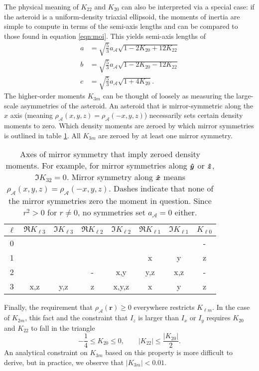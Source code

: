 The physical meaning of $K_{22}$ and $K_{20}$ can also be interpreted via a special case: if the asteroid is a uniform-density triaxial ellipsoid, the moments of inertia are simple to compute in terms of the semi-axis lengths and can be compared to those found in equation \ref{eqn:moi}. This yields semi-axis lengths of 
\begin{equation}
  \begin{split}
  a &= \sqrt{\frac{5}{3}}a_\mathcal{A}\sqrt{1-2K_{20}+12K_{22}}\\
  b &= \sqrt{\frac{5}{3}}a_\mathcal{A}\sqrt{1-2K_{20}-12K_{22}}\\
  c &= \sqrt{\frac{5}{3}}a_\mathcal{A}\sqrt{1+4K_{20}}.
  \label{eqn:ellipsoid-axes}
  \end{split}
\end{equation}
The higher-order moments $K_{3m}$ can be thought of loosely as measuring the large-scale asymmetries of the asteroid. An asteroid that is mirror-symmetric along the $\unit{x}$ axis (meaning $\rho_\mathcal{A}(x,y,z)=\rho_\mathcal{A}(-x,y,z)$) necessarily sets certain density moments to zero. Which density moments are zeroed by which mirror symmetries is outlined in table \ref{tab:klm-symmetries}. All $K_{3m}$ are zeroed by at least one mirror symmetry. 

\begin{table}
  \centering
  \begin{tabular}{c|ccccccc}
    \hline
    $\ell$ & $\Re K_{\ell 3}$ & $\Im K_{\ell 3}$ & $\Re K_{\ell 2}$ & $\Im K_{\ell 2}$ & $\Re K_{\ell 1}$ & $\Im K_{\ell 1}$ & $K_{\ell 0}$ \\ \hline
    0 &  &  &  &  &  &  & -\\ 
    1 &  &  &  &  & x & y & z\\ 
    2 &  &  & - & x,y & y,z & x,z & -\\ 
    3 & x,z & y,z & z & x,y,z & x & y & z\\ \hline
  \end{tabular}
  \caption{Axes of mirror symmetry that imply zeroed density moments. For example, for mirror symmetries along $\bm{\hat{y}}$ or $\bm{\hat{z}}$, $\Im K_{32}=0$. Mirror symmetry along $\bm{\hat{x}}$ means $\rho_\mathcal{A}(x, y, z) = \rho_\mathcal{A}(-x, y, z)$. Dashes indicate that none of the mirror symmetries zero the moment in question. Since $r^2>0$ for $r\neq 0$, no symmetries set $a_\mathcal{A}=0$ either.}
  \label{tab:klm-symmetries}
\end{table} 

Finally, the requirement that $\rho_\mathcal{A}(\bm r) \geq 0$ everywhere restricts $K_{\ell m}$. In the case of $K_{2m}$, this fact and the constraint that $I_z$ is larger than $I_x$ or $I_y$ requires $K_{20}$ and $K_{22}$ to fall in the triangle
\begin{equation}
  -\frac{1}{4} \leq K_{20} \leq 0, \qquad |K_{22}| \leq \frac{|K_{20}|}{2}.
  \label{eqn:parameter-bounds}
\end{equation}
An analytical constraint on $K_{3m}$ based on this property is more difficult to derive, but in practice, we observe that $|K_{3m}| < 0.01$.





